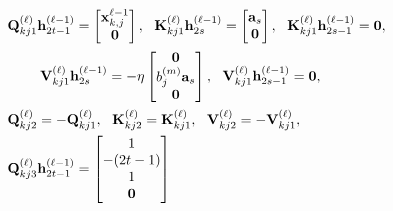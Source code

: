 \begin{align*}
    &{\mathbf Q}_{kj1}^{(\ell)}{\mathbf h}^{(\ell-1)}_{2t-1}=\begin{bmatrix}
        {\mathbf x}_{k,j}^{\ell-1}\\{\mathbf 0}
    \end{bmatrix},~~ {\mathbf K}_{kj1}^{(\ell)}{\mathbf h}^{(\ell-1)}_{2s}=\begin{bmatrix}
        {\mathbf a}_{s}\\{\mathbf 0}
\end{bmatrix},~~{\mathbf K}_{kj1}^{(\ell)}{\mathbf h}^{(\ell-1)}_{2s-1}={\mathbf 0},\\
&~~~~ ~~~{\mathbf V}_{kj1}^{(\ell)}{\mathbf h}^{(\ell-1)}_{2s}=-\eta\begin{bmatrix}
        {\mathbf 0}\\ b_j^{(m)}{\mathbf a}_s \\ {\mathbf 0}
    \end{bmatrix},~~{\mathbf V}_{kj1}^{(\ell)}{\mathbf h}^{(\ell-1)}_{2s-1}={\mathbf 0},\\
    &
    {\mathbf Q}_{kj2}^{(\ell)}=-{\mathbf Q}_{kj1}^{(\ell)},~~ {\mathbf K}_{kj2}^{(\ell)}={\mathbf K}_{kj1}^{(\ell)},~~  {\mathbf V}_{kj2}^{(\ell)}=-{\mathbf V}_{kj1}^{(\ell)},\\
     &
     {\mathbf Q}_{kj3}^{(\ell)}{\mathbf h}^{(\ell-1)}_{2t-1}=\begin{bmatrix}
         1\\-(2t-1)\\ 1\\{\mathbf 0}

\end{bmatrix}
\end{align*}
